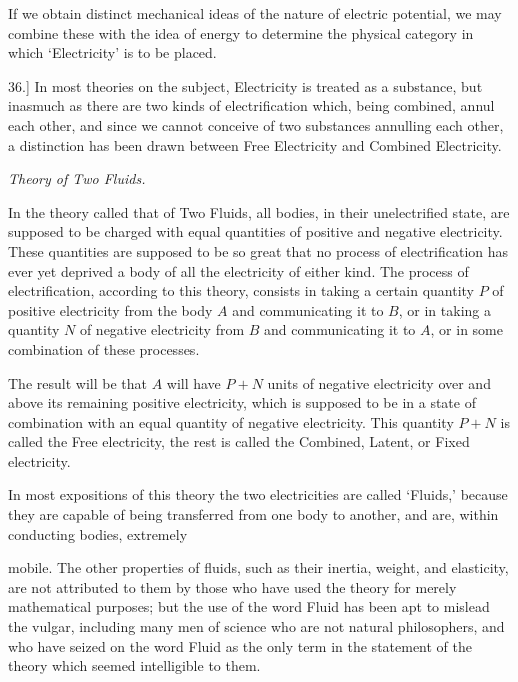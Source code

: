 \documentclass[11pt,a4paper]{article}
\begin{document}
If we obtain distinct mechanical ideas of the nature of electric
potential, we may combine these with the idea of energy to determine
the physical category in which `Electricity' is to be placed.

36.] In most theories on the subject, Electricity is treated as a
substance, but inasmuch as there are two kinds of electrification which,
being combined, annul each other, and since we cannot conceive of two
substances annulling each other, a distinction has been drawn between
Free Electricity and Combined Electricity.

\begin{center}
\textit{Theory of Two Fluids.}
\end{center}

In the theory called that of Two Fluids, all bodies, in their
unelectrified state, are supposed to be charged with equal quantities of
positive and negative electricity. These quantities are supposed to be
so great that no process of electrification has ever yet deprived a
body of all the electricity of either kind. The process of
electrification, according to this theory, consists in taking a certain
quantity \(P\) of positive electricity from the body \(A\) and
communicating it to \(B\), or in taking a quantity \(N\) of negative
electricity from \(B\) and communicating it to \(A\), or in some
combination of these processes.

The result will be that \(A\) will have \(P+N\) units of negative
electricity over and above its remaining positive electricity, which is
supposed to be in a state of combination with an equal quantity of
negative electricity. This quantity \(P+N\) is called the Free
electricity, the rest is called the Combined, Latent, or Fixed
electricity.

In most expositions of this theory the two electricities are called
`Fluids,' because they are capable of being transferred from one body to
another, and are, within conducting bodies, extremely

\clearpage
\setcounter{footnote}{0}

mobile. The other properties of fluids, such as their inertia, weight,
and elasticity, are not attributed to them by those who have used the
theory for merely mathematical purposes; but the use of the word Fluid
has been apt to mislead the vulgar, including many men of science who
are not natural philosophers, and who have seized on the word Fluid as
the only term in the statement of the theory which seemed intelligible
to them.
\end{document}
